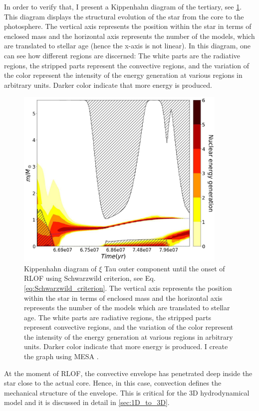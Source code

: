 In order to verify that, I present a Kippenhahn diagram of the tertiary, see \cref{fig:kippen_plot}. This diagram displays the structural evolution of the star from the core to the photosphere. The vertical axis represents the position within the star in terms of enclosed mass and the horizontal axis represents the number of the models, which are translated to stellar age (hence the x-axis is not linear). In this diagram, one can see how different regions are discerned: The white parts are the radiative regions, the stripped parts represent the convective regions, and the variation of the color represent the intensity of the energy generation at various regions in arbitrary units. Darker color indicate that more energy is produced.
\begin{figure}[H]
    \centering
    \includegraphics[width=0.9\textwidth]{Thesis/graphs/Kippen_ROLF_Schw.pdf}
    \caption{Kippenhahn diagram of $\xi$ Tau outer component until the onset of RLOF using Schwarzwild criterion, see Eq. \eqref{eq:Schwarzwild_criterion}. The vertical axis represents the position within the star in terms of enclosed mass and the horizontal axis represents the number of the models which are translated to stellar age. The white parts are radiative regions, the stripped parts represent convective regions, and the variation of the color represent the intensity of the energy generation at various regions in arbitrary units. Darker color indicate that more energy is produced. I create the graph using MESA \citep{paxton2010modules,paxton2013modules,paxton2015modules,paxton2019modules}.}
    \label{fig:kippen_plot}
\end{figure}
At the moment of RLOF, the convective envelope has penetrated deep inside the star close to the actual core. Hence, in this case, convection defines the mechanical structure of the envelope. This is critical for the 3D hydrodynamical model and it is discussed in detail in \cref{sec:1D_to_3D}. 

